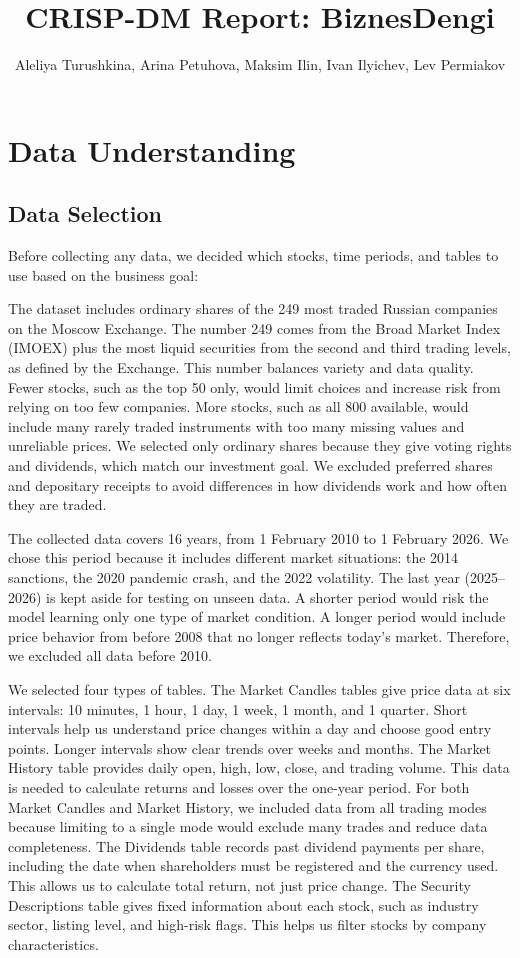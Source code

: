 \documentclass[oneside,final,12pt,a4paper]{extreport}
\title{CRISP-DM Report: BiznesDengi}
\author{Aleliya Turushkina, Arina Petuhova, Maksim Ilin, Ivan Ilyichev, Lev Permiakov}
\begin{document}
\maketitle

\newpage

\section{Data Understanding}
\subsection{Data Selection}
Before collecting any data, we decided which stocks, time periods, and tables to use based on the business goal:

The dataset includes ordinary shares of the 249 most traded Russian companies on the Moscow Exchange. The number 249 comes from the Broad Market Index (IMOEX) plus the most liquid securities from the second and third trading levels, as defined by the Exchange. This number balances variety and data quality. Fewer stocks, such as the top 50 only, would limit choices and increase risk from relying on too few companies. More stocks, such as all 800 available, would include many rarely traded instruments with too many missing values and unreliable prices. We selected only ordinary shares because they give voting rights and dividends, which match our investment goal. We excluded preferred shares and depositary receipts to avoid differences in how dividends work and how often they are traded.

The collected data covers 16 years, from 1 February 2010 to 1 February 2026. We chose this period because it includes different market situations: the 2014 sanctions, the 2020 pandemic crash, and the 2022 volatility. The last year (2025–2026) is kept aside for testing on unseen data. A shorter period would risk the model learning only one type of market condition. A longer period would include price behavior from before 2008 that no longer reflects today's market. Therefore, we excluded all data before 2010.

We selected four types of tables. The Market Candles tables give price data at six intervals: 10 minutes, 1 hour, 1 day, 1 week, 1 month, and 1 quarter. Short intervals help us understand price changes within a day and choose good entry points. Longer intervals show clear trends over weeks and months. The Market History table provides daily open, high, low, close, and trading volume. This data is needed to calculate returns and losses over the one-year period. For both Market Candles and Market History, we included data from all trading modes because limiting to a single mode would exclude many trades and reduce data completeness. The Dividends table records past dividend payments per share, including the date when shareholders must be registered and the currency used. This allows us to calculate total return, not just price change. The Security Descriptions table gives fixed information about each stock, such as industry sector, listing level, and high-risk flags. This helps us filter stocks by company characteristics.
\end{document}
